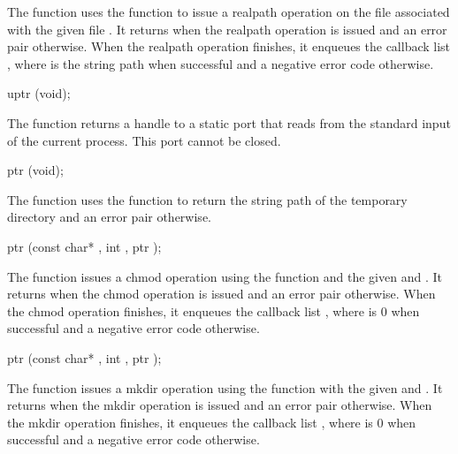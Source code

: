 The  function uses the
 function to issue a realpath operation on the
file associated with the given file . It returns 
when the realpath operation is issued and an error pair
otherwise. When the realpath operation finishes, it enqueues the
callback list , where 
is the string path when successful and a negative error code otherwise.

\begin{function}
  uptr (void);
\end{function}

The  function returns a handle to a static port
that reads from the standard input of the current process. This port
cannot be closed.

\begin{function}
  ptr (void);
\end{function}

The  function uses the
 function to return the string path of the
temporary directory and an error pair otherwise.

\begin{function}
  ptr (const char* , int , ptr );
\end{function}

The  function issues a chmod operation using the
 function and the given  and
. It returns  when the chmod operation is issued
and an error pair otherwise. When the chmod operation finishes, it
enqueues the callback list , where
 is 0 when successful and a negative error code otherwise.

\begin{function}
  ptr (const char* , int , ptr );
\end{function}

The  function issues a mkdir operation
using the  function with the given  and
. It returns  when the mkdir operation is issued
and an error pair otherwise. When the mkdir operation finishes, it
enqueues the callback list , where
 is 0 when successful and a negative error code otherwise.

